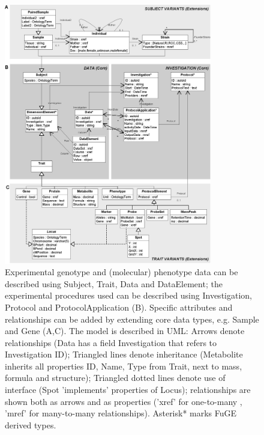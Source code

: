 \begin{figure}[h!]
  \centering
  \includegraphics[width=0.81\textwidth]{eps/image_4_3.eps}
  \caption[XGAP.]
    {Experimental genotype and (molecular) phenotype data can be described using Subject, Trait, Data and DataElement; 
    the experimental procedures used can be described using Investigation, Protocol and ProtocolApplication (B). Specific 
    attributes and relationships can be added by extending core data types, e.g. Sample and Gene (A,C). The model is 
    described in UML: Arrows denote relationships (Data has a field Investigation that refers to Investigation ID); 
    Triangled lines denote inheritance (Metabolite inherits all properties ID, Name, Type from Trait, next to mass, 
    formula and structure); Triangled dotted lines denote use of interface (Spot 'implements' properties of Locus); 
    relationships are shown both as arrows and as properties ('xref' for one-to-many , 'mref' for many-to-many 
    relationships). Asterisk* marks FuGE derived types.}
\end{figure}

